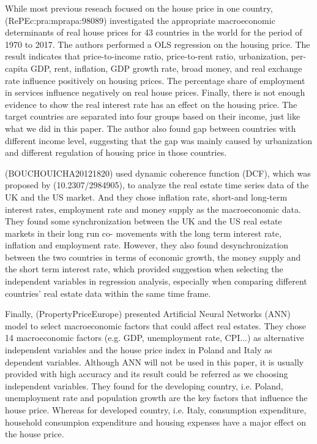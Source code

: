 \documentclass[11pt]{article}
\begin{document}
While most previous reseach focused on the house price in one country, (RePEc:pra:mprapa:98089) investigated the appropriate macroeconomic determinants of real house prices for 43 countries in the world for the period of 1970 to 2017. The authors performed a OLS regression on the housing price. The result indicates that price-to-income ratio, price-to-rent ratio, urbanization, per-capita GDP, rent, inflation, GDP growth rate, broad money, and real exchange rate influence positively on housing prices. The percentage share of employment in services influence negatively on real house prices. Finally, there is not enough evidence to show the real interest rate has an effect on the housing price. The target countries are separated into four groups based on their income, just like what we did in this paper. The author also found gap between countries with different income level, suggesting that the gap was mainly caused by urbanization and different regulation of housing price in those countries.

(BOUCHOUICHA20121820) used dynamic coherence function (DCF), which was proposed by (10.2307/2984905), to analyze the real estate time series data of the UK and the US market. And they chose inflation rate, short-and long-term interest rates, employment rate and money supply as the macroeconomic data. They found some synchronization between the UK and the US real estate markets in their long run co- movements with the long term interest rate, inflation and employment rate. However, they also found desynchronization between the two countries in terms of economic growth, the money supply and the short term interest rate, which provided suggestion when selecting the independent variables in regression analysis, especially when comparing different countries' real estate data within the same time frame.

Finally, (PropertyPriceEurope) presented Artificial Neural Networks (ANN) model to select macroeconomic factors that could affect real estates. They chose 14 macroeconomic factors (e.g. GDP, unemployment rate, CPI...) as alternative independent variables and the house price index in Poland and Italy as dependent variables. Although ANN will not be used in this paper, it is usually provided with high accuracy and its result could be referred as we choosing independent variables. They found for the developing country, i.e. Poland, unemployment rate and population growth are the key factors that influence the house price. Whereas for developed country, i.e. Italy, consumption expenditure, household consumpion expenditure and housing expenses have a major effect on the house price.



\end{document}
